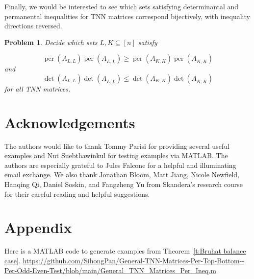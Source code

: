 \documentclass[12pt]{amsart}
\newtheorem{prob}[thm]{Problem}
\theoremstyle{definition}
\numberwithin{equation}{section}
\DeclareMathOperator{\perm}{per}
\begin{document}
Finally, we would be interested to see which sets satisfying determinantal and permanental inequalities for TNN matrices
correspond bijectively,
with inequality directions reversed.
\begin{prob}
Decide which sets $L,K \subseteq [n]$ satisfy

\begin{equation*}
\perm(A_{L,L})\perm(A_{\overline{L},\overline{L}}) \geq \perm(A_{K,K})\perm(A_{\overline{K},\overline{K}})
    \end{equation*} and \begin{equation*}
\det(A_{L,L})\det(A_{\overline{L},\overline{L}}) \leq \det(A_{K,K})\det(A_{\overline{K},\overline{K}})
    \end{equation*} for all TNN matrices.
\end{prob}

\section*{Acknowledgements}
The authors would like to thank Tommy Parisi for providing several useful examples and Nut Suebthawinkul for testing examples via MATLAB. The authors are especially grateful to Jules Falcone for a helpful and illuminating email exchange. We also thank Jonathan Bloom, Matt Jiang, Nicole Newfield, Hanqing Qi, Daniel Soskin, and Fangzheng Yu from Skandera's research course for their careful reading and helpful suggestions.

\section{Appendix}

Here is a MATLAB code to generate examples from Theorem~\ref{t:Bruhat balance case}.
\url{https://github.com/SihongPan/General-TNN-Matrices-Per-Top-Bottom--Per-Odd-Even-Test/blob/main/General_TNN_Matrices_Per_Ineq.m}




\end{document}
